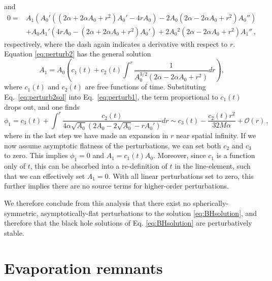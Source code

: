 \documentclass[reprint,amsmath,amssymbGaps,onecolumn,notitlepage,nofootinbib]{revtex4-1}
\begin{document}
and
\begin{equation}
\begin{aligned}
0=&A_1 \left(A_0' \left(\left(2 \alpha +2 \alpha  A_0+r^2\right) A_0'-4 r A_0\right)-2 A_0 \left(2 \alpha -2 \alpha  A_0+r^2\right) A_0''\right)\\&+A_0 A_1' \left(4 r A_0-\left(2 \alpha +2 \alpha  A_0+r^2\right) A_0'\right)+2 A_0{}^2 \left(2 \alpha -2 \alpha  A_0+r^2\right) A_1''\,,
\end{aligned}
\label{eq:perturb2}
\end{equation}
respectively, where the dash again indicates a derivative with respect to $r$.
Equation \eqref{eq:perturb2} has the general solution
\begin{equation}
A_1 = A_0 \left(c_1(t) + c_2(t) \int^r \frac{1}{A_0^{3/2}\left(2\alpha- 2\alpha A_0 + r^2 \right)} dr \right),
\label{eq:perturb2sol}
\end{equation}
where $c_1(t)$ and $c_2(t)$ are free functions
of time. Substituting Eq.~\eqref{eq:perturb2sol} into 
Eq.~\eqref{eq:perturb1}, the term proportional 
to $c_1(t)$ drops out, and one finds 
\begin{equation}
\phi_1 = c_3(t) + \int^r \frac{c_2(t)}{4\alpha \sqrt{A_0} \left(2A_0-2\sqrt{A_0}-r A_0'\right)} dr  \sim c_3(t) - \frac{c_2(t) r^2}{32 M \alpha} + \mathcal{O}(r) \,,
\end{equation}
where in the last step we have made an expansion in $r$ 
near spatial infinity. 
If we now assume asymptotic flatness of the perturbations, we can set both $c_2$ and $c_3$ to zero. This implies $\phi_1=0$ and $A_1= c_1 (t) A_0$. Moreover, since $c_1$ is a function  only of $t$, this can be absorbed into a re-definition of $t$ in the line-element, such that we can effectively set $A_1=0$. With all linear perturbations 
set to zero, this further implies there are no source terms for higher-order perturbations.


We therefore conclude from this analysis that there exist no spherically-symmetric, asymptotically-flat perturbations to the solution \eqref{eq:BHsolution}, and therefore that the black hole solutions of Eq. \eqref{eq:BHsolution} are perturbatively stable. 

\section{Evaporation remnants}
\label{sec:remnants}
\end{document}
